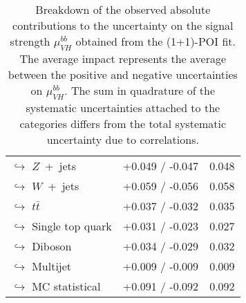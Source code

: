 \begin{table}[tbp]
\begin{center}
\begin{tabular}{ l | l  c c }
        \multicolumn{2}{l}{$\hookrightarrow$ $Z$~+~jets} & +0.049 / -0.047  & 0.048 \\
        \multicolumn{2}{l}{$\hookrightarrow$ $W$~+~jets} & +0.059 / -0.056  & 0.058 \\
        \multicolumn{2}{l}{$\hookrightarrow$ $t\bar{t}$} & +0.037 / -0.032  & 0.035 \\
        \multicolumn{2}{l}{$\hookrightarrow$ Single top quark} & +0.031 / -0.023  & 0.027 \\
        \multicolumn{2}{l}{$\hookrightarrow$ Diboson} & +0.034 / -0.029  & 0.032 \\
        \multicolumn{2}{l}{$\hookrightarrow$ Multijet} & +0.009 / -0.009  & 0.009 \\
        \multicolumn{2}{l}{$\hookrightarrow$ MC statistical} & +0.091 / -0.092  & 0.092 \\        
        \hline\bottomrule
    \end{tabular}
    \end{center}
    \caption{
        Breakdown of the observed absolute contributions to the uncertainty on the signal strength $\mu_{VH}^{bb}$ obtained from the (1+1)-POI fit. 
        The average impact represents the average between the positive and negative uncertainties on $\mu_{VH}^{bb}$.
        The sum in quadrature of the systematic uncertainties attached to the categories differs from the total systematic uncertainty due to correlations. 
    }
    \label{tab:mu_syst_unc}
\end{table}
    